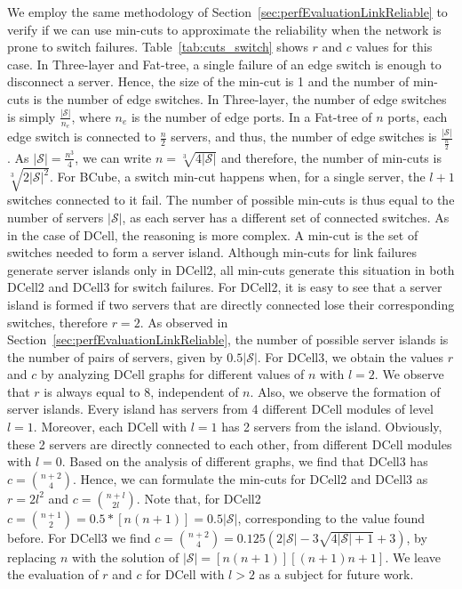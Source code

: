 We employ the same methodology of Section~\ref{sec:perfEvaluationLinkReliable} to verify if we can use min-cuts to approximate the reliability when the network is prone to switch failures. Table~\ref{tab:cuts_switch} shows $r$ and $c$ values for this case. In Three-layer and Fat-tree, a single failure of an edge switch is enough to disconnect a server. Hence, the size of the min-cut is 1 and the number of min-cuts is the number of edge switches. 
In Three-layer, the number of edge switches is simply $\frac{|\mathcal{S}|}{n_e}$, where $n_e$ is the number of edge ports.
In a Fat-tree of $n$ ports, each edge switch is connected to $\frac{n}{2}$ servers, and thus, the number of edge switches is $\frac{|\mathcal{S}|}{\frac{n}{2}}$. As $|\mathcal{S}|=\frac{n^3}{4}$, we can write $n=\sqrt[3]{4|\mathcal{S}|}$ and therefore, the number of min-cuts is $\sqrt[3]{2|\mathcal{S}|^2}$. For BCube, a switch min-cut happens when, for a single server, the $l+1$ switches connected to it fail. The number of possible min-cuts is thus equal to the number of servers $|\mathcal{S}|$, as each server has a different set of connected switches.
As in the case of DCell, the reasoning is more complex. A min-cut is the set of switches needed to form a server island.
Although min-cuts for link failures generate server islands only in DCell2, all min-cuts generate this situation in both DCell2 and DCell3 for switch failures. For DCell2, it is easy to see that a server island is formed if two servers that are directly connected lose their corresponding switches, therefore $r=2$. As observed in Section~\ref{sec:perfEvaluationLinkReliable}, the number of possible server islands is the number of pairs of servers, given by $0.5|\mathcal{S}|$. For DCell3, we obtain the values $r$ and $c$ by analyzing DCell graphs for different values of $n$ with $l=2$. We observe that $r$ is always equal to 8, independent of $n$. Also, we observe the formation of server islands. Every island has servers from 4 different DCell modules of level $l=1$. Moreover, each DCell with $l=1$ has 2 servers from the island. Obviously, these 2 servers are directly connected to each other, from different DCell modules with $l=0$. Based on the analysis of different graphs, we find that DCell3 has $c=\binom{
n+2}{4}$. Hence, we can formulate the min-cuts for DCell2 and DCell3 as $r=2l^2$ and $c=\binom{n+l}{2l}$. Note that, for DCell2 $c=\binom{n+1}{2}=0.5*[n(n+1)]=0.5|\mathcal{S}|$, corresponding to the value found before. 
For DCell3 we find $c=\binom{n+2}{4}=0.125(2|\mathcal{S}| - 3\sqrt{4|\mathcal{S}|+1} + 3 )$, by replacing $n$ with the solution of $|\mathcal{S}| = [n(n+1)][(n+1)n +1]$. We leave the evaluation of $r$ and $c$ for DCell with $l>2$ as a subject for future work.
